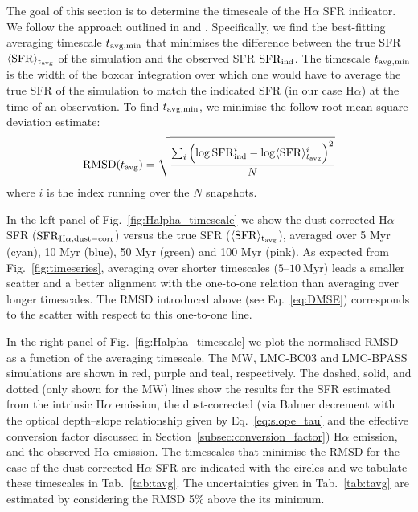 \documentclass[fleqn,usenatbib]{mnras}
\begin{document}
The goal of this section is to determine the timescale of the H$\alpha$ SFR indicator. We follow the approach outlined in \citet{caplar19} and \citet{flores-velazquez21}. Specifically, we find the best-fitting averaging timescale $t_{\rm avg, min}$ that minimises the difference between the true SFR $\langle\mathrm{SFR}\rangle_{\rm t_{\rm avg}}$ of the simulation and the observed SFR $\mathrm{SFR}_{\rm ind}$. The timescale $t_{\rm avg, min}$ is the width of the boxcar integration over which one would have to average the true SFR of the simulation to match the indicated SFR (in our case H$\alpha$) at the time of an observation. To find $t_{\rm avg, min}$, we minimise the follow root mean square deviation estimate:
\begin{equation}
    \mathrm{RMSD}(t_{\rm avg}) = \sqrt{\frac{\sum_i \left(\log\mathrm{SFR}_{\rm ind}^{i} - \log\langle \mathrm{SFR}\rangle_{t_{\rm avg}}^{i}  \right)^{2}}{N}}
    \label{eq:DMSE}
\end{equation}
where $i$ is the index running over the $N$ snapshots. 

In the left panel of Fig.~\ref{fig:Halpha_timescale} we show the dust-corrected H$\alpha$ SFR ($\mathrm{SFR}_{\rm H\alpha,dust-corr}$) versus the true SFR ($\langle \mathrm{SFR} \rangle_{\rm t_{\rm avg}}$), averaged over 5 Myr (cyan), 10 Myr (blue), 50 Myr (green) and 100 Myr (pink). As expected from Fig.~\ref{fig:timeseries}, averaging over shorter timescales ($5$--$10~\mathrm{Myr}$) leads a smaller scatter and a better alignment with the one-to-one relation than averaging over longer timescales. The RMSD introduced above (see Eq.~\ref{eq:DMSE}) corresponds to the scatter with respect to this one-to-one line.

In the right panel of Fig.~\ref{fig:Halpha_timescale} we plot the normalised RMSD as a function of the averaging timescale. The MW, LMC-BC03 and LMC-BPASS simulations are shown in red, purple and teal, respectively. The dashed, solid, and dotted (only shown for the MW) lines show the results for the SFR estimated from the intrinsic H$\alpha$ emission, the dust-corrected (via Balmer decrement with the optical depth--slope relationship given by Eq.~\ref{eq:slope_tau} and the effective conversion factor discussed in Section~\ref{subsec:conversion_factor}) H$\alpha$ emission, and the observed H$\alpha$ emission. The timescales that minimise the RMSD for the case of the dust-corrected H$\alpha$ SFR are indicated with the circles and we tabulate these timescales in Tab.~\ref{tab:tavg}. The uncertainties given in Tab.~\ref{tab:tavg} are estimated by considering the RMSD 5\% above the its minimum.
\end{document}
